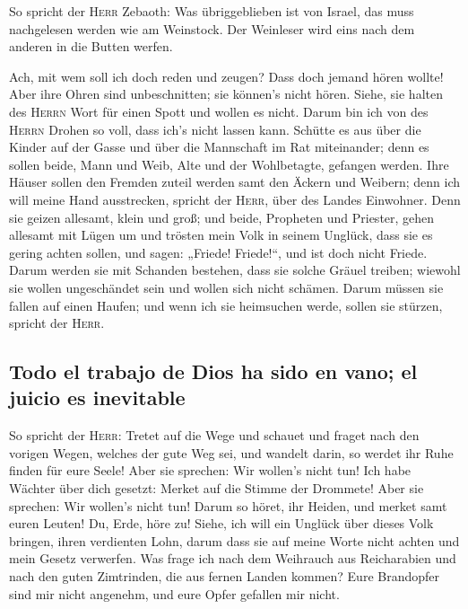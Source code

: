  So spricht der \textsc{Herr} Zebaoth: Was übriggeblieben
ist von Israel, das muss nachgelesen werden wie am Weinstock. Der
Weinleser wird eins nach dem anderen in die Butten werfen.

 Ach, mit wem soll ich doch reden und zeugen? Dass doch
jemand hören wollte! Aber ihre Ohren sind unbeschnitten; sie können's
nicht hören. Siehe, sie halten des \textsc{Herrn} Wort für einen Spott
und wollen es nicht.  Darum bin ich von des
\textsc{Herrn} Drohen so voll, dass ich's nicht lassen kann. Schütte es
aus über die Kinder auf der Gasse und über die Mannschaft im Rat
miteinander; denn es sollen beide, Mann und Weib, Alte und der
Wohlbetagte, gefangen werden.  Ihre Häuser sollen den
Fremden zuteil werden samt den Äckern und Weibern; denn ich will meine
Hand ausstrecken, spricht der \textsc{Herr}, über des Landes Einwohner.
 Denn sie geizen allesamt, klein und groß; und beide,
Propheten und Priester, gehen allesamt mit Lügen um  und
trösten mein Volk in seinem Unglück, dass sie es gering achten sollen,
und sagen: „Friede! Friede!{}``, und ist doch nicht Friede.
 Darum werden sie mit Schanden bestehen, dass sie solche
Gräuel treiben; wiewohl sie wollen ungeschändet sein und wollen sich
nicht schämen. Darum müssen sie fallen auf einen Haufen; und wenn ich
sie heimsuchen werde, sollen sie stürzen, spricht der \textsc{Herr}.

\hypertarget{todo-el-trabajo-de-dios-ha-sido-en-vano-el-juicio-es-inevitable}{%
\subsection{Todo el trabajo de Dios ha sido en vano; el juicio es
inevitable}\label{todo-el-trabajo-de-dios-ha-sido-en-vano-el-juicio-es-inevitable}}

 So spricht der \textsc{Herr}: Tretet auf die Wege und
schauet und fraget nach den vorigen Wegen, welches der gute Weg sei, und
wandelt darin, so werdet ihr Ruhe finden für eure Seele! Aber sie
sprechen: Wir wollen's nicht tun!  Ich habe Wächter über
dich gesetzt: Merket auf die Stimme der Drommete! Aber sie sprechen: Wir
wollen's nicht tun!  Darum so höret, ihr Heiden, und
merket samt euren Leuten!  Du, Erde, höre zu! Siehe, ich
will ein Unglück über dieses Volk bringen, ihren verdienten Lohn, darum
dass sie auf meine Worte nicht achten und mein Gesetz verwerfen.
 Was frage ich nach dem Weihrauch aus Reicharabien und
nach den guten Zimtrinden, die aus fernen Landen kommen? Eure Brandopfer
sind mir nicht angenehm, und eure Opfer gefallen mir nicht.

